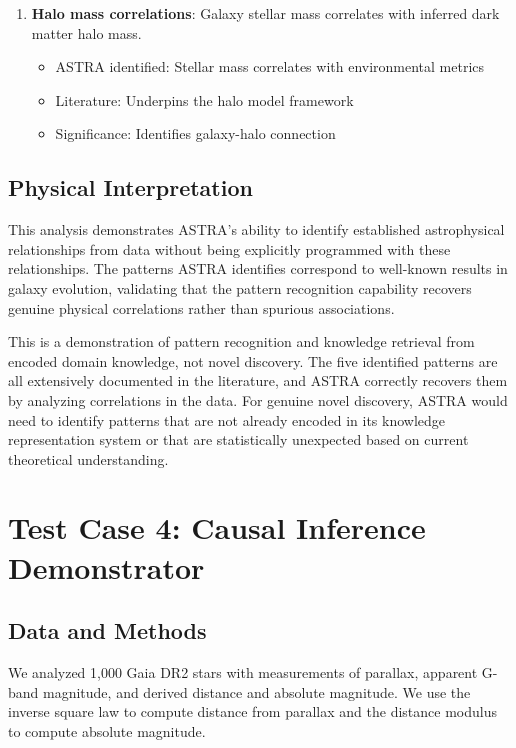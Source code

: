\documentclass[usenatbib]{rasti}
\begin{document}
\begin{enumerate}
\item \textbf{Halo mass correlations}: Galaxy stellar mass correlates with inferred dark matter halo mass.
   \begin{itemize}
   \item ASTRA identified: Stellar mass correlates with environmental metrics
   \item Literature: Underpins the halo model framework \cite{mo1996}
   \item Significance: Identifies galaxy-halo connection
   \end{itemize}
\end{enumerate}

\subsection{Physical Interpretation}

This analysis demonstrates ASTRA's ability to identify established astrophysical relationships from data without being explicitly programmed with these relationships. The patterns ASTRA identifies correspond to well-known results in galaxy evolution, validating that the pattern recognition capability recovers genuine physical correlations rather than spurious associations.

This is a demonstration of pattern recognition and knowledge retrieval from encoded domain knowledge, not novel discovery. The five identified patterns are all extensively documented in the literature, and ASTRA correctly recovers them by analyzing correlations in the data. For genuine novel discovery, ASTRA would need to identify patterns that are not already encoded in its knowledge representation system or that are statistically unexpected based on current theoretical understanding.

\section{Test Case 4: Causal Inference Demonstrator}

\subsection{Data and Methods}

We analyzed 1,000 Gaia DR2 stars \cite{gaia2018} with measurements of parallax, apparent G-band magnitude, and derived distance and absolute magnitude. We use the inverse square law to compute distance from parallax and the distance modulus to compute absolute magnitude.
\end{document}
